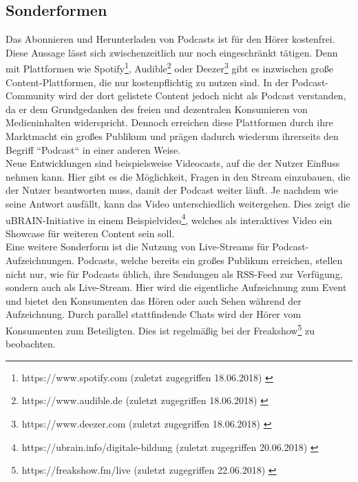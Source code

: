 \documentclass[11pt,a4paper]{scrreprt}
\begin{document}
\subsection{Sonderformen}
\frqq Das Abonnieren und Herunterladen von Podcasts ist für den Hörer kostenfrei.\flqq\,Diese Aussage lässt sich zwischenzeitlich nur noch eingeschränkt tätigen. Denn mit Plattformen wie Spotify\footnote{https://www.spotify.com (zuletzt zugegriffen 18.06.2018) \cite{SpotifyAB}}, Audible\footnote{https://www.audible.de (zuletzt zugegriffen 18.06.2018) \cite{AudibleGmbH}} oder Deezer\footnote{https://www.deezer.com (zuletzt zugegriffen 18.06.2018) \cite{DeezerGmbH}} gibt es inzwischen große Content-Plattformen, die nur kostenpflichtig zu nutzen sind. In der Podcast-Community wird der dort gelistete Content jedoch nicht als Podcast verstanden, da er dem Grundgedanken des freien und dezentralen Konsumieren von Medieninhalten widerspricht. Dennoch erreichen diese Plattformen durch ihre Marktmacht ein großes Publikum und prägen dadurch wiederum ihrerseits den Begriff ``Podcast`` in einer anderen Weise.\\
Neue Entwicklungen sind beispielsweise Videocasts, auf die der Nutzer Einfluss nehmen kann. Hier gibt es die Möglichkeit, Fragen in den Stream einzubauen, die der Nutzer beantworten muss, damit der Podcast weiter läuft. Je nachdem wie seine Antwort ausfällt, kann das Video unterschiedlich weitergehen. Dies zeigt die uBRAIN-Initiative in einem Beispielvideo\footnote{https://ubrain.info/digitale-bildung (zuletzt zugegriffen 20.06.2018) \cite{BNUG2016}}, welches als interaktives Video ein Showcase für weiteren Content sein soll.\\
Eine weitere Sonderform ist die Nutzung von Live-Streams für Podcast-Aufzeichnungen. Podcasts, welche bereits ein großes Publikum erreichen, stellen nicht nur, wie für Podcasts üblich, ihre Sendungen als \ac{RSS}-Feed zur Verfügung, sondern auch als Live-Stream. Hier wird die eigentliche Aufzeichnung zum Event und bietet den Konsumenten das Hören oder auch Sehen während der Aufzeichnung. Durch parallel stattfindende Chats wird der Hörer vom Konsumenten zum Beteiligten. Dies ist regelmäßig bei der Freakshow\footnote{https://freakshow.fm/live (zuletzt zugegriffen 22.06.2018) \cite{MPM2008}} zu beobachten.
\end{document}
